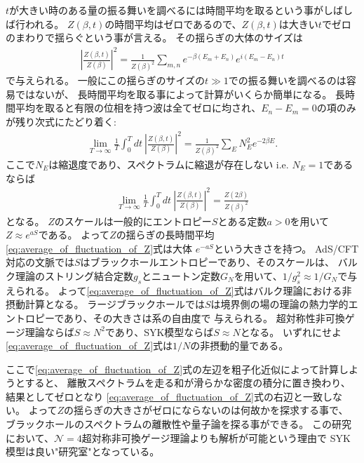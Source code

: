 $t$が大きい時のある量の振る舞いを調べるには時間平均を取るという事がしばしば行われる。
$Z(\beta, t)$の時間平均はゼロであるので、$Z(\beta, t)$は大きい$t$でゼロのまわりで揺らぐという事が言える。
その揺らぎの大体のサイズは
\begin{align}
	\left|\frac{Z(\beta, t)}{Z(\beta)}\right|^2
	= \frac{1}{Z(\beta)^2}\sum_{m,n}e^{-\beta(E_m + E_n)}e^{i(E_m - E_n)t}
\end{align}
で与えられる。
一般にこの揺らぎのサイズの$t \gg 1$での振る舞いを調べるのは容易ではないが、
長時間平均を取る事によって計算がいくらか簡単になる。
長時間平均を取ると有限の位相を持つ波は全てゼロに均され、$E_n-E_m = 0$の項のみが残り次式にたどり着く:
\begin{align}
	\lim_{T\to\infty}\frac{1}{T}\int_0^Tdt\ \left|\frac{Z(\beta, t)}{Z(\beta)}\right|^2
	= \frac{1}{Z(\beta)^2}\sum_E N_E^2e^{-2\beta E}.
\end{align}
ここで$N_E$は縮退度であり、スペクトラムに縮退が存在しない i.e. $N_E = 1$であるならば
\begin{align}
	\lim_{T\to\infty}\frac{1}{T}\int_0^Tdt\ \left|\frac{Z(\beta, t)}{Z(\beta)}\right|^2
	= \frac{Z(2\beta)}{Z(\beta)^2}
	\label{eq:average_of_fluctuation_of_Z}
\end{align} 
となる。
$Z$のスケールは一般的にエントロピー$S$とある定数$a > 0$を用いて$Z \approx e^{aS}$である。
よって$Z$の揺らぎの長時間平均\eqref{eq:average_of_fluctuation_of_Z}式は大体
$e^{-aS}$という大きさを持つ。
AdS/CFT対応の文脈では$S$はブラックホールエントロピーであり、そのスケールは、
バルク理論のストリング結合定数$g_s$とニュートン定数$G_N$を用いて、$1/g_s^2 \approx 1/G_N$で与えられる。
よって\eqref{eq:average_of_fluctuation_of_Z}式はバルク理論における非摂動計算となる。
ラージブラックホールでは$S$は境界側の場の理論の熱力学的エントロピーであり、その大きさは系の自由度で
与えられる。
超対称性非可換ゲージ理論ならば$S\approx N^2$であり、SYK模型ならば$S\approx N$となる。
いずれにせよ\eqref{eq:average_of_fluctuation_of_Z}式は$1/N$の非摂動的量である。

ここで\eqref{eq:average_of_fluctuation_of_Z}式の左辺を粗子化近似によって計算しようとすると、
離散スペクトラムを走る和が滑らかな密度の積分に置き換わり、結果としてゼロとなり
\eqref{eq:average_of_fluctuation_of_Z}式の右辺と一致しない。
よって$Z$の揺らぎの大きさがゼロにならないのは何故かを探求する事で、
ブラックホールのスペクトラムの離散性や量子論を探る事ができる。
この研究において、$\mathcal{N}=4$超対称非可換ゲージ理論よりも解析が可能という理由で
SYK模型は良い"研究室"となっている。

